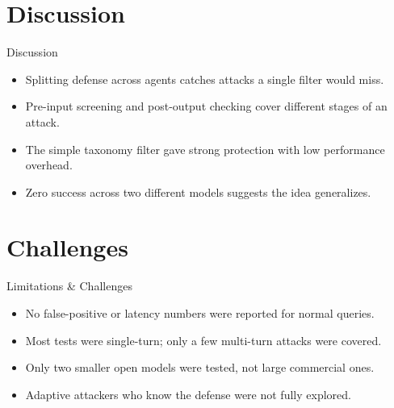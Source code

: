 \documentclass[10pt]{beamer}
\begin{document}
\section{Discussion}
\begin{frame}{Discussion}
\begin{itemize}
  \item Splitting defense across agents catches attacks a single filter would miss.
  \item Pre-input screening and post-output checking cover different stages of an attack.
  \item The simple taxonomy filter gave strong protection with low performance overhead.
  \item Zero success across two different models suggests the idea generalizes.
\end{itemize}
\end{frame}
\section{Challenges}
\begin{frame}{Limitations \& Challenges}
\begin{itemize}
  \item No false-positive or latency numbers were reported for normal queries.
  \item Most tests were single-turn; only a few multi-turn attacks were covered.
  \item Only two smaller open models were tested, not large commercial ones.
  \item Adaptive attackers who know the defense were not fully explored.
\end{itemize}
\end{frame}
\end{document}
